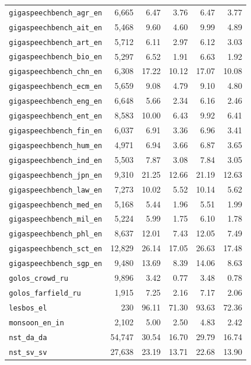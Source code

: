 \begin{table}[!ht]
\begin{tabular}{lrrrrr}
\texttt{gigaspeechbench\_agr\_en} & 6,665 & 6.47 & 3.76 & 6.47 & 3.77\\
\texttt{gigaspeechbench\_ait\_en} & 5,468 & 9.60 & 4.60 & 9.99 & 4.89\\
\texttt{gigaspeechbench\_art\_en} & 5,712 & 6.11 & 2.97 & 6.12 & 3.03\\
\texttt{gigaspeechbench\_bio\_en} & 5,297 & 6.52 & 1.91 & 6.63 & 1.92\\
\texttt{gigaspeechbench\_chn\_en} & 6,308 & 17.22 & 10.12 & 17.07 & 10.08\\
\texttt{gigaspeechbench\_ecm\_en} & 5,659 & 9.08 & 4.79 & 9.10 & 4.80\\
\texttt{gigaspeechbench\_eng\_en} & 6,648 & 5.66 & 2.34 & 6.16 & 2.46\\
\texttt{gigaspeechbench\_ent\_en} & 8,583 & 10.00 & 6.43 & 9.92 & 6.41\\
\texttt{gigaspeechbench\_fin\_en} & 6,037 & 6.91 & 3.36 & 6.96 & 3.41\\
\texttt{gigaspeechbench\_hum\_en} & 4,971 & 6.94 & 3.66 & 6.87 & 3.65\\
\texttt{gigaspeechbench\_ind\_en} & 5,503 & 7.87 & 3.08 & 7.84 & 3.05\\
\texttt{gigaspeechbench\_jpn\_en} & 9,310 & 21.25 & 12.66 & 21.19 & 12.63\\
\texttt{gigaspeechbench\_law\_en} & 7,273 & 10.02 & 5.52 & 10.14 & 5.62\\
\texttt{gigaspeechbench\_med\_en} & 5,168 & 5.44 & 1.96 & 5.51 & 1.99\\
\texttt{gigaspeechbench\_mil\_en} & 5,224 & 5.99 & 1.75 & 6.10 & 1.78\\
\texttt{gigaspeechbench\_phl\_en} & 8,637 & 12.01 & 7.43 & 12.05 & 7.49\\
\texttt{gigaspeechbench\_sct\_en} & 12,829 & 26.14 & 17.05 & 26.63 & 17.48\\
\texttt{gigaspeechbench\_sgp\_en} & 9,480 & 13.69 & 8.39 & 14.06 & 8.63\\
\texttt{golos\_crowd\_ru} & 9,896 & 3.42 & 0.77 & 3.48 & 0.78\\
\texttt{golos\_farfield\_ru} & 1,915 & 7.25 & 2.16 & 7.17 & 2.06\\
\texttt{lesbos\_el} & 230 & 96.11 & 71.30 & 93.63 & 72.36\\
\texttt{monsoon\_en\_in} & 2,102 & 5.00 & 2.50 & 4.83 & 2.42\\
\texttt{nst\_da\_da} & 54,747 & 30.54 & 16.70 & 29.79 & 16.74\\
\texttt{nst\_sv\_sv} & 27,638 & 23.19 & 13.71 & 22.68 & 13.90\\

\end{tabular}
\end{table}
